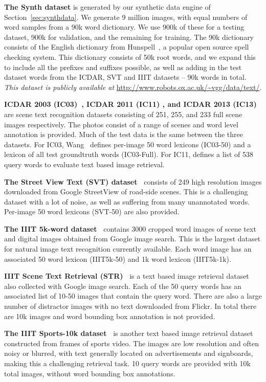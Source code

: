 \documentclass[twocolumn]{svjour3}          \smartqed  \usepackage{epsfig}
\begin{document}
{\bf The Synth dataset}
 is generated by our synthetic data engine of Section~\ref{sec:synthdata}. We generate 9 million  images, with equal numbers of word samples from a 90k word dictionary. We use 900k of these for a testing dataset, 900k for validation, and the remaining for training. The 90k dictionary consists of the English dictionary from Hunspell~\cite{hunspell}, a popular open source spell checking system. This dictionary consists of 50k root words, and we expand this to include all the prefixes and suffixes possible, as well as adding in the test dataset words from the ICDAR, SVT and IIIT datasets -- 90k words in total. \emph{This dataset is publicly available at } \url{http://www.robots.ox.ac.uk/~vgg/data/text/}.

{\bf ICDAR 2003 (IC03)~\cite{icdar2003dataset}, ICDAR 2011 (IC11) \cite{ICDAR11}, and ICDAR 2013 (IC13)~\cite{ICDAR2013}}
are scene text recognition datasets consisting of 251, 255, and 233 full scene images respectively. The photos consist of a range of scenes and word level annotation is provided. Much of the test data is the same between the three datasets. For IC03, Wang~\cite{Wang11} defines per-image 50 word lexicons (IC03-50) and a lexicon of all test groundtruth words (IC03-Full). For IC11, \cite{Mishra13} defines a list of 538 query words to evaluate text based image retrieval.

{\bf The Street View Text (SVT) dataset~\cite{Wang11}}
consists of 249 high resolution images downloaded from Google StreetView of road-side scenes. This is a challenging dataset with a lot of noise, as well as suffering from many unannotated words. Per-image 50 word lexicons (SVT-50) are also provided.

{\bf The IIIT 5k-word dataset~\cite{Mishra12}}
contains 3000 cropped word images of scene text and digital images obtained from Google image search. This is the largest dataset for natural image text recognition currently available. Each word image has an associated 50 word lexicon (IIIT5k-50) and 1k word lexicon (IIIT5k-1k).

{\bf IIIT Scene Text Retrieval (STR)~\cite{Mishra13}}
is a text based image retrieval dataset also collected with Google image search. Each of the 50 query words has an associated list of 10-50 images that contain the query word. There are also a large number of distractor images with no text downloaded from Flickr. In total there are 10k images and word bounding box annotation is not provided.

{\bf The IIIT Sports-10k dataset~\cite{Mishra13}}
is another text based image retrieval dataset constructed from frames of sports video. The images are low resolution and often noisy or blurred, with text generally located on advertisements and signboards, making this a challenging retrieval task. 10 query words are provided with 10k total images, without word bounding box annotations.
\end{document}
